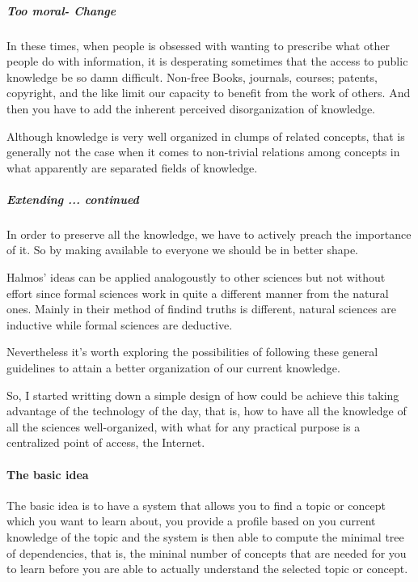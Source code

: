 \subparagraph{Too moral- Change}
\indent
In these times, when people is obsessed with wanting to prescribe
what other people do with information, it is desperating sometimes
that the access to public knowledge be so damn difficult. Non-free Books, 
journals, courses; patents, copyright, and the like limit our capacity
to benefit from the work of others. And then you have to add the 
inherent perceived disorganization of knowledge.
\par

\indent
Although knowledge is very well organized in clumps of 
related concepts, that is generally not the case when it 
comes to non-trivial relations among concepts in what apparently
are separated fields of knowledge.
\par

\subparagraph{ Extending ... continued}
\indent
In order to preserve all the knowledge, we have to actively
preach the importance of it. So by making available to everyone
we should be in better shape.
\par

\indent
Halmos' ideas can be applied analogoustly to other sciences but
not without effort since formal sciences work in quite a different
manner from the natural ones. Mainly in their method of findind 
truths is different, natural sciences are inductive while formal 
sciences are deductive.

\indent
Nevertheless it's worth exploring 
the possibilities of following these general guidelines to attain
a better organization of our current knowledge.
\par

\indent
So, I started writting down a simple design of how could be
achieve this taking advantage of the technology of the day, 
that is, how to have all the knowledge of all the sciences
well-organized, with what for any practical purpose is a centralized
point of access, the Internet.
\par

\paragraph{The basic idea}
\indent
The basic idea is to have a system that allows you to 
find a topic or concept which you want to learn about, you 
provide a profile based on you current knowledge of the
topic and the system is then able to compute the minimal
tree of dependencies, that is, the mininal number of concepts
that are needed for you to learn before you are able to 
actually understand the selected topic or concept.
\par

